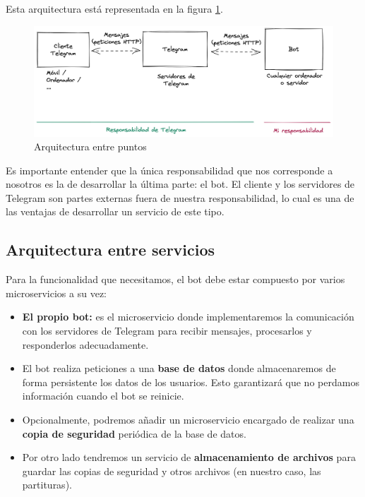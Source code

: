 Esta arquitectura está representada en la figura \ref{fig:arquitecturaPuntos}.

\begin{figure}[h]
\centering
\includegraphics[width=1\textwidth]{imagenes/disenyo_tecnico/arquitectura_puntos.png}
\caption{Arquitectura entre puntos}
\label{fig:arquitecturaPuntos}
\end{figure}

Es importante entender que la única responsabilidad que nos corresponde a nosotros es la de desarrollar la última parte: el bot. El cliente y los servidores de Telegram son partes externas fuera de nuestra responsabilidad, lo cual es una de las ventajas de desarrollar un servicio de este tipo.




\subsection{Arquitectura entre servicios}

Para la funcionalidad que necesitamos, el bot debe estar compuesto por varios microservicios a su vez: 

\begin{itemize}
    \item \textbf{El propio bot:} es el microservicio donde implementaremos la comunicación con los servidores de Telegram para recibir mensajes, procesarlos y responderlos adecuadamente.
    \item El bot realiza peticiones a una \textbf{base de datos} donde almacenaremos de forma persistente los datos de los usuarios. Esto garantizará que no perdamos información cuando el bot se reinicie.
    \item Opcionalmente, podremos añadir un microservicio encargado de realizar una \textbf{copia de seguridad} periódica de la base de datos.
    \item Por otro lado tendremos un servicio de \textbf{almacenamiento de archivos} para guardar las copias de seguridad y otros archivos (en nuestro caso, las partituras).
\end{itemize}

